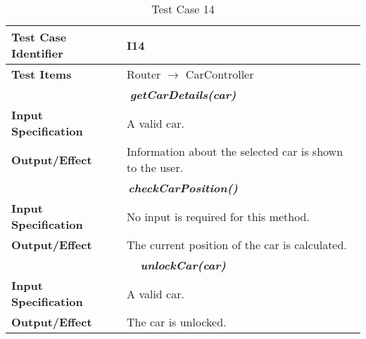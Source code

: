 \begin{table}[h]
	\begin{tabularx}{\textwidth}{l X}
		\hline
		\textbf{Test Case Identifier}	&	I14\\	\hline
		\textbf{Test Items}			&	Router $\rightarrow$ CarController \\	\hline\hline
		\multicolumn{2}{c}{\textbf{\textit{getCarDetails(car)}}}	\\	\hline
			\textbf{Input Specification}	&	A valid car.\\	\hline
			\textbf{Output/Effect}	&	Information about the selected car is shown to the user.\\	\hline\hline
		\multicolumn{2}{c}{\textbf{\textit{checkCarPosition()}}}	\\	\hline
			\textbf{Input Specification}	&	No input is required for this method.\\	\hline
			\textbf{Output/Effect}	&	The current position of the car is calculated.\\	\hline\hline
		\multicolumn{2}{c}{\textbf{\textit{unlockCar(car)}}}	\\	\hline
			\textbf{Input Specification}	&	A valid car.\\	\hline
			\textbf{Output/Effect}	&	The car is unlocked.\\	\hline\hline
	\end{tabularx}
	\captionsetup{textformat=empty,labelformat=blank}
	\caption{Test Case 14}
	\label{table:template-table-14}
\end{table}
